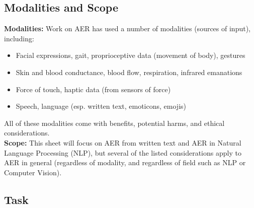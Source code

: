 \documentclass{clv3}
\begin{document}
\subsection{Modalities and Scope}

\noindent \textbf{Modalities:} Work on AER has used a number of modalities (sources of input), including:\\[-20pt]
\begin{itemize}
    \item Facial expressions, gait, proprioceptive data (movement of body), gestures 
    \vspace*{-1mm}
    \item Skin and blood conductance, blood flow, respiration, infrared emanations
\vspace*{-1mm}
    \item Force of touch, haptic data (from sensors of force) 
    \vspace*{-1mm}
    \item Speech, language (esp. written text, emoticons, emojis) 
\end{itemize}
\vspace*{-3mm}
\noindent All of these modalities come with benefits, potential harms, and ethical considerations.\\[5pt]
\noindent \textbf{Scope:} This sheet will focus on AER from written text and AER in Natural Language Processing (NLP), but 
several of the listed considerations apply to AER in general (regardless of modality, and regardless of field such as NLP or Computer Vision).

\subsection{Task}
\label{sec:tasks}
\end{document}
